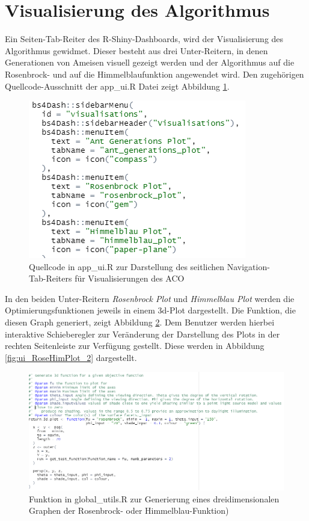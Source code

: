 \section{Visualisierung des Algorithmus} \label{chap:Visualisierung}


Ein Seiten-Tab-Reiter des R-Shiny-Dashboards, wird der Visualisierung des Algorithmus gewidmet. 
Dieser besteht aus drei Unter-Reitern, in denen Generationen von Ameisen visuell gezeigt werden und der Algorithmus auf die Rosenbrock- und auf die Himmelblaufunktion angewendet wird. Den zugehörigen Quellcode-Ausschnitt der app\_ui.R Datei zeigt Abbildung \ref{fig:app_ui_visualisations_tab}. 

\begin{figure}[H]
 \centering
 \includegraphics[scale=1]{"images/04_Visualisierung_des_Algorithmus/app_ui_visualisations_tab.png"}
 \caption{Quellcode in app\_ui.R zur Darstellung des seitlichen Navigation-Tab-Reiters für Visualisierungen des ACO}
 \label{fig:app_ui_visualisations_tab}
\end{figure}

In den beiden Unter-Reitern \textit{Rosenbrock Plot} und \textit{Himmelblau Plot} werden die Optimierungsfunktionen jeweils in einem 3d-Plot dargestellt. Die Funktion, die diesen Graph generiert, zeigt Abbildung \ref{fig:util_3dplot}.
Dem Benutzer werden hierbei interaktive Schieberegler zur Veränderung der Darstellung des Plots in der rechten Seitenleiste zur Verfügung gestellt. Diese werden in Abbildung \ref{fig:ui_RoseHimPlot_2} dargestellt. 

\begin{figure}[H]
 \centering
 \includegraphics[scale=0.7]{"images/04_Visualisierung_des_Algorithmus/util_3dplot.png"}
 \caption{Funktion in global\_utils.R zur Generierung eines dreidimensionalen Graphen der Rosenbrock- oder Himmelblau-Funktion)}
 \label{fig:util_3dplot}
\end{figure}


